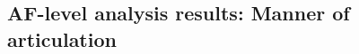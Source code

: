 \documentclass[transmag]{IEEEtran}
\begin{document}


\subsection{AF-level analysis results: Manner of articulation}

%  




\end{document}
